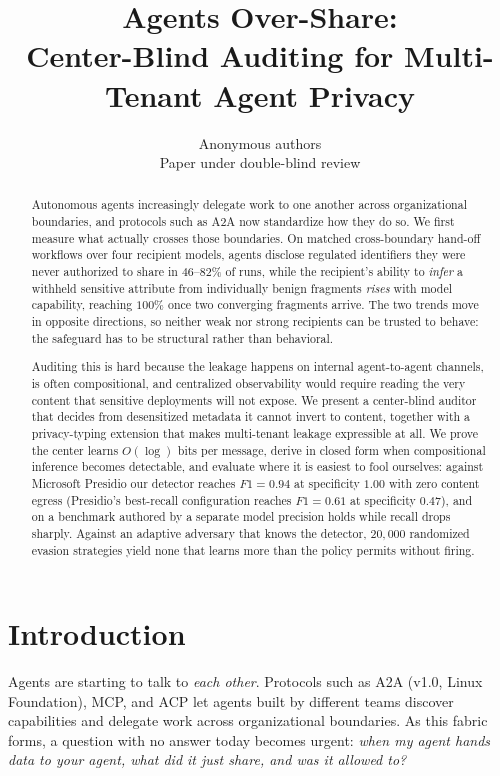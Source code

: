 \documentclass{article}
\title{Agents Over-Share:\\
Center-Blind Auditing for Multi-Tenant Agent Privacy}
\author{Anonymous authors\\Paper under double-blind review}
\begin{document}
\maketitle


\begin{abstract}
Autonomous agents increasingly delegate work to one another across organizational
boundaries, and protocols such as A2A now standardize how they do so. We first
measure what actually crosses those boundaries. On matched cross-boundary
hand-off workflows over four recipient models, agents disclose regulated
identifiers they were never authorized to share in $46$--$82\%$ of runs, while the
recipient's ability to \emph{infer} a withheld sensitive attribute from
individually benign fragments \emph{rises} with model capability, reaching $100\%$
once two converging fragments arrive. The two trends move in opposite directions,
so neither weak nor strong recipients can be trusted to behave: the safeguard has
to be structural rather than behavioral.

Auditing this is hard because the leakage happens on internal agent-to-agent
channels, is often compositional, and centralized observability would require
reading the very content that sensitive deployments will not expose. We present a
center-blind auditor that decides from desensitized metadata it cannot invert to
content, together with a privacy-typing extension that makes multi-tenant leakage
expressible at all. We prove the center learns $O(\log)$ bits per message, derive
in closed form when compositional inference becomes detectable, and evaluate where
it is easiest to fool ourselves: against Microsoft Presidio our detector reaches
$F1=0.94$ at specificity $1.00$ with zero content egress (Presidio's best-recall
configuration reaches $F1=0.61$ at specificity $0.47$), and on a benchmark authored
by a separate model precision holds while recall drops sharply. Against an adaptive
adversary that knows the detector, $20{,}000$ randomized evasion strategies yield
none that learns more than the policy permits without firing.
\end{abstract}


\section{Introduction}
Agents are starting to talk to \emph{each other}. Protocols such as A2A (v1.0,
Linux Foundation), MCP, and ACP let agents built by different teams discover
capabilities and delegate work across organizational boundaries. As this fabric
forms, a question with no answer today becomes urgent: \emph{when my agent hands
data to your agent, what did it just share, and was it allowed to?}
\end{document}
